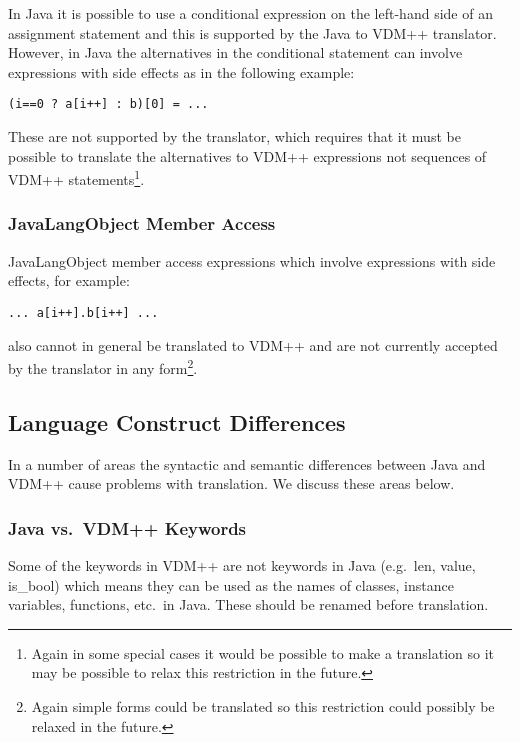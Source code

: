 \documentclass[\pformat,12pt]{article}
\begin{document}
In Java it is possible to use a conditional expression on the
left-hand side of an assignment statement and this is supported by the
Java to VDM++ translator. However, in Java the alternatives in the
conditional statement can involve expressions with side effects as in
the following example:

\begin{small}
\begin{verbatim}
(i==0 ? a[i++] : b)[0] = ...
\end{verbatim}
\end{small}

These are not supported by the translator, which requires that it must
be possible to translate the alternatives to VDM++ expressions not
sequences of VDM++ statements\footnote{Again in some special cases it
  would be possible to make a translation so it may be possible to
  relax this restriction in the future.}.

\subsubsection{JavaLangObject Member Access}

JavaLangObject member access expressions which involve expressions with side
effects, for example:

\begin{small}
\begin{verbatim}
... a[i++].b[i++] ...
\end{verbatim}
\end{small}

also cannot in general be translated to VDM++ and are not currently
accepted by the translator in any form\footnote{Again simple forms
  could be translated so this restriction could possibly be relaxed in
  the future.}.

\subsection{Language Construct Differences}

In a number of areas the syntactic and semantic differences
between Java and VDM++ cause problems with translation. We discuss
these areas below.

\subsubsection{Java vs.\ VDM++ Keywords}

Some of the keywords in VDM++ are not keywords in Java (e.g.\ len,
value, is\_bool) which means they can be used as the names of classes,
instance variables, functions, etc.\ in Java. These should be renamed
before translation.
\end{document}
